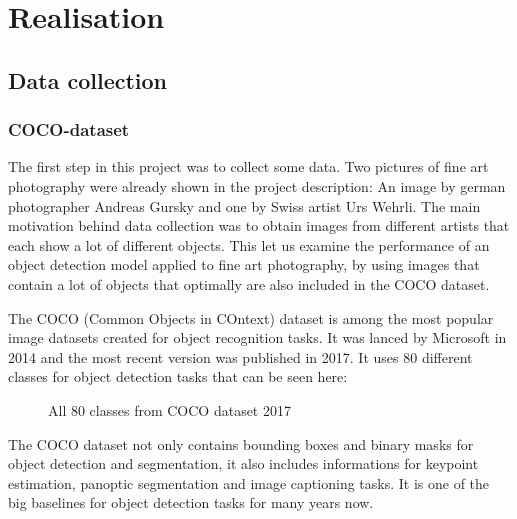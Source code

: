 \chapter{Realisation}

\section{Data collection}

\subsection{COCO-dataset}

The first step in this project was to collect some data. Two pictures of fine art photography were already shown in the project description: An image by german photographer Andreas Gursky and one by Swiss artist Urs Wehrli. The main motivation behind data collection was to obtain images from different artists that each show a lot of different objects. This let us examine the performance of an object detection model applied to fine art photography, by using images that contain a lot of objects that optimally are also included in the COCO dataset.

The COCO (Common Objects in COntext) dataset is among the most popular image datasets created for object recognition tasks. It was lanced by Microsoft in 2014 and the most recent version was published in 2017. It uses 80 different classes for object detection tasks that can be seen here:

\begin{figure}[!h]
	\caption{\label{fig:input-image} All 80 classes from COCO dataset 2017}
\end{figure}

The COCO dataset not only contains bounding boxes and binary masks for object detection and segmentation, it also includes informations for keypoint estimation, panoptic segmentation and image captioning tasks. It is one of the big baselines for object detection tasks for many years now.

